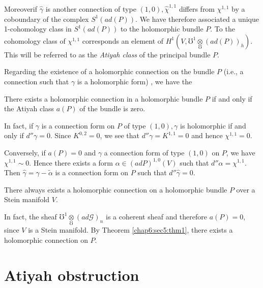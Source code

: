 Moreover\pageoriginale if $\hat{\gamma}$ is another connection of type $(1, 0),
\hat{\chi}^{1,1}$ differs from $\chi^{1,1}$ by a coboundary of the
complex $S^1 (ad(P))$. We have therefore associated a unique
1-cohomology class in $S^1 (ad(P))$ to the holomorphic bundle $P$. To
the cohomology class of $\chi^{1,1}$ corresponds an element of $H^1
(V, \mho^1 \underset{\mho}\otimes (ad (P))_h)$. This will be referred
to as the \textit{Atiyah class} of the principal bundle $P$. 

Regarding the existence of a holomorphic connection on the bundle $P$
(i.e., a connection such that $\gamma$ is a holomorphic form) , we have
the 

\setcounter{theorem}{0}
\begin{theorem}\label{chap6:sec5:thm1}%
  There exists a holomorphic connection in a holomorphic bundle $P$ if
  and only if the Atiyah class $a(P)$ of the bundle is zero. 
\end{theorem}

In fact, if $\gamma$ is a connection form on $P$ of type $(1, 0),
\gamma$ is holomorphic if and only if $d'' \gamma = 0$. Since $K^{0,
  2} = 0$, we see that $d'' \gamma = K^{1,1} = 0$ and hence
$\chi^{1,1} = 0$. 

Conversely, if $a(P) = 0$ and $\gamma$  a connection form of type
$(1, 0)$ on $P$, we have $\chi^{1, 1} \sim 0$. Hence there exists a
form $\alpha \in (ad P)^{1, 0}(V)$ such that $d'' \alpha =
\chi^{1,1}$. Then $\hat{\gamma} = \gamma - \tilde{\alpha}$ is a
connection form on $P$ such that $d'' \hat{\gamma} = 0$. 

\begin{coro*}%
  There always exists a holomorphic connection on a holomorphic bundle
  $P$ over a Stein manifold $V$. 
\end{coro*}

In fact, the sheaf $\mho^1 \underset{\mho}\otimes (ad \mathscr{G})_n$
is a coherent sheaf and therefore $a(P)=0$, since $V$ is a Stein
manifold. By Theorem \ref{chap6:sec5:thm1}, there exists a holomorphic connection on
$P$. 

\setcounter{section}{6}
\section{Atiyah obstruction}\label{chap6:sec7}%

